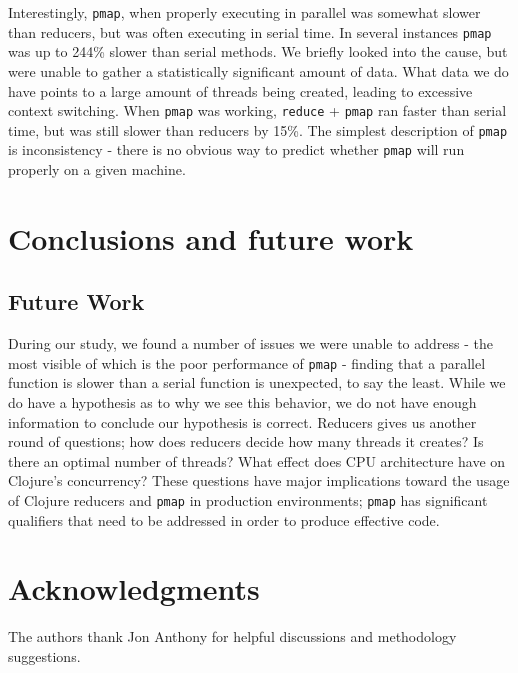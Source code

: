 \documentclass[12pt]{article}
\newcommand{\clocode}[1]{{\texttt {#1}}}
\begin{document}
Interestingly, \clocode{pmap}, when properly executing in parallel was somewhat slower than reducers, but was often executing in serial time. In several instances \clocode{pmap} was up to 244\% slower than serial methods. We briefly looked into the cause, but were unable to gather a statistically significant amount of data. What data we do have points to a large amount of threads being created, leading to excessive context switching. When \clocode{pmap} was working, \clocode{reduce} + \clocode{pmap} ran faster than serial time, but was still slower than reducers by 15\%. The simplest description of \clocode{pmap} is inconsistency - there is no obvious way to predict whether \clocode{pmap} will run properly on a given machine.

\section{Conclusions and future work}\label{sec:conclusion}




\subsection{Future Work}\label{sec:future}
During our study, we found a number of issues we were unable to address - the most visible of which is the poor performance of \clocode{pmap} - finding that a parallel function is slower than a serial function is unexpected, to say the least. While we do have a hypothesis as to why we see this behavior, we do not have enough information to conclude our hypothesis is correct. Reducers gives us another round of questions; how does reducers decide how many threads it creates? Is there an optimal number of threads? What effect does CPU architecture have on Clojure's concurrency?	
These questions have major implications toward the usage of Clojure reducers and \clocode{pmap} in production environments; \clocode{pmap} has significant qualifiers that need to be addressed in order to produce effective code.

\section{Acknowledgments} 
The authors thank Jon Anthony for helpful discussions and methodology suggestions. 




%
%




%  
%
%










\end{document}
